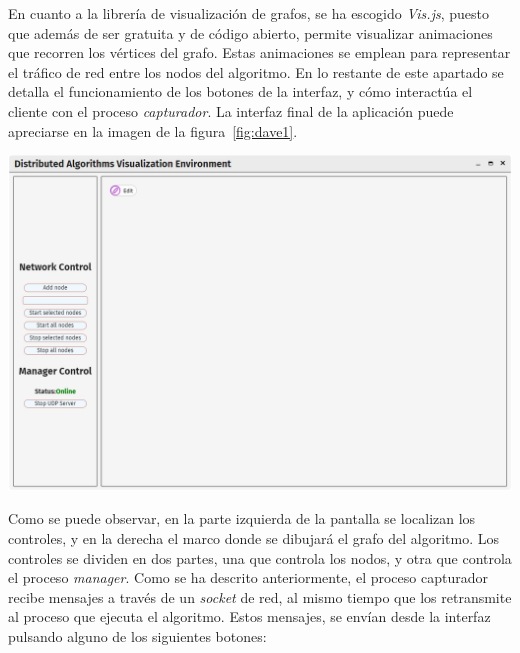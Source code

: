 En cuanto a la librería de visualización de grafos, se ha escogido \textit{Vis.js}\cite{visjs}, puesto que además de ser gratuita y de código abierto, permite visualizar animaciones que recorren los vértices del grafo. Estas animaciones se emplean para representar el tráfico de red entre los nodos del algoritmo. En lo restante de este apartado se detalla el funcionamiento de los botones de la interfaz, y cómo interactúa el cliente con el proceso \textit{capturador}. La interfaz final de la aplicación puede apreciarse en la imagen de la figura~\ref{fig:dave1}.

{
\centering
\includegraphics[width=0.9\linewidth]{imagenes/dave1}
\label{fig:dave1}
}

Como se puede observar, en la parte izquierda de la pantalla se localizan los controles, y en la derecha el marco donde se dibujará el grafo del algoritmo. Los controles se dividen en dos partes, una que controla los nodos, y otra que controla el proceso \textit{manager}. Como se ha descrito anteriormente, el proceso capturador recibe mensajes a través de un \textit{socket} de red, al mismo tiempo que los retransmite al proceso que ejecuta el algoritmo. Estos mensajes, se envían desde la interfaz pulsando alguno de los siguientes botones:

